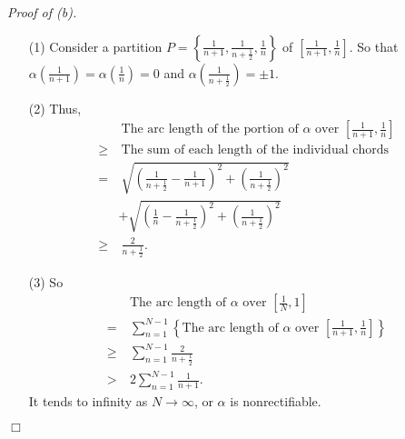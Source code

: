 \documentclass{article}
\begin{document}
\emph{Proof of (b).}
\begin{enumerate}
  \item[(1)]
  Consider a partition
  $P = \left\{ \frac{1}{n+1}, \frac{1}{n+\frac{1}{2}}, \frac{1}{n} \right\}$
  of $\left[ \frac{1}{n+1},\frac{1}{n} \right]$.
  So that $\alpha(\frac{1}{n+1}) = \alpha(\frac{1}{n}) = 0$
  and $\alpha(\frac{1}{n+\frac{1}{2}}) = \pm 1$.

  \item[(2)]
  Thus,
  \begin{align*}
    & \: \text{The arc length of the portion of $\alpha$ over
      $\left[ \frac{1}{n+1},\frac{1}{n} \right]$} \\
    \geq& \:
    \text{The sum of each length of the individual chords} \\
    =& \: \sqrt{
      \left( \frac{1}{n+\frac{1}{2}} - \frac{1}{n+1} \right)^2
        + \left( \frac{1}{n + \frac{1}{2}} \right)^2
    } \\
    & + \sqrt{
      \left( \frac{1}{n} - \frac{1}{n+\frac{1}{2}} \right)^2
        + \left( \frac{1}{n + \frac{1}{2}} \right)^2
    } \\
    \geq& \:
    \frac{2}{n + \frac{1}{2}}.
  \end{align*}

  \item[(3)]
  So
  \begin{align*}
    & \: \text{The arc length of $\alpha$ over $\left[\frac{1}{N},1\right]$} \\
    =& \: \sum_{n=1}^{N-1}
      \left\{
        \text{The arc length of $\alpha$ over $\left[\frac{1}{n+1},\frac{1}{n}\right]$}
      \right\} \\
    \geq& \: \sum_{n=1}^{N-1} \frac{2}{n + \frac{1}{2}} \\
    >& \: 2 \sum_{n=1}^{N-1} \frac{1}{n + 1}.
  \end{align*}
  It tends to infinity as $N \to \infty$, or
  $\alpha$ is nonrectifiable.
\end{enumerate}
$\Box$ \\\\



\end{document}
